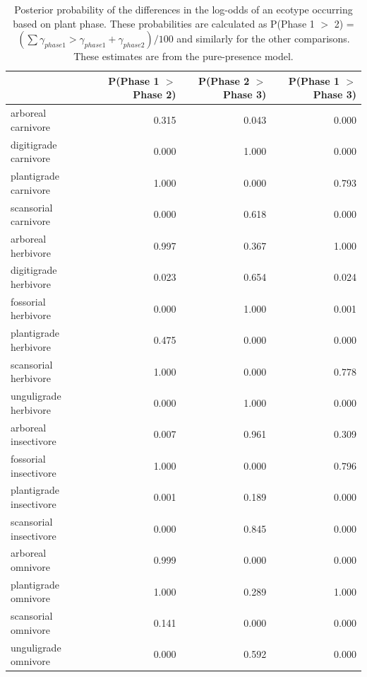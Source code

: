 \documentclass[12pt,letterpaper]{article}
\begin{document}
\begin{table}[ht]
  \centering
  \caption[Posterior probablity estimates of differences in occurrence by plant phase]{Posterior probability of the differences in the log-odds of an ecotype occurring based on plant phase. These probabilities are calculated as P(Phase 1 \(>\) 2) = \( (\sum \gamma_{phase 1} > \gamma_{phase 1} + \gamma_{phase 2}) / 100\) and similarly for the other comparisons. These estimates are from the pure-presence model.}
  \label{tab:occur_plant}
  \begin{tabular}{ l r r r }
    \hline
    & P(Phase 1 $>$ Phase 2) & P(Phase 2 $>$ Phase 3) & P(Phase 1 $>$ Phase 3) \\ 
    \hline
    arboreal carnivore & 0.315 & 0.043 & 0.000 \\ 
    digitigrade carnivore & 0.000 & 1.000 & 0.000 \\ 
    plantigrade carnivore & 1.000 & 0.000 & 0.793 \\ 
    scansorial carnivore & 0.000 & 0.618 & 0.000 \\ 
    arboreal herbivore & 0.997 & 0.367 & 1.000 \\ 
    digitigrade herbivore & 0.023 & 0.654 & 0.024 \\ 
    fossorial herbivore & 0.000 & 1.000 & 0.001 \\ 
    plantigrade herbivore & 0.475 & 0.000 & 0.000 \\ 
    scansorial herbivore & 1.000 & 0.000 & 0.778 \\ 
    unguligrade herbivore & 0.000 & 1.000 & 0.000 \\ 
    arboreal insectivore & 0.007 & 0.961 & 0.309 \\ 
    fossorial insectivore & 1.000 & 0.000 & 0.796 \\ 
    plantigrade insectivore & 0.001 & 0.189 & 0.000 \\ 
    scansorial insectivore & 0.000 & 0.845 & 0.000 \\ 
    arboreal omnivore & 0.999 & 0.000 & 0.000 \\ 
    plantigrade omnivore & 1.000 & 0.289 & 1.000 \\ 
    scansorial omnivore & 0.141 & 0.000 & 0.000 \\ 
    unguligrade omnivore & 0.000 & 0.592 & 0.000 \\ 
    \hline
  \end{tabular}
\end{table}
\end{document}
